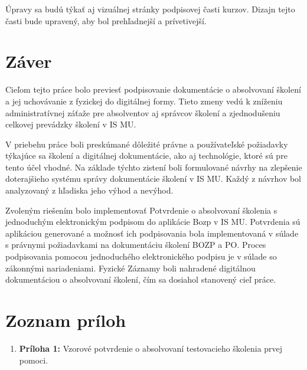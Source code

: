 \documentclass[
  digital,     %
  oneside,     %
  nosansbold,  %
  nocolorbold, %
  lof,         %
  nolot,         %
]{fithesis4}
\begin{document}
Úpravy sa budú týkať aj vizuálnej stránky podpisovej časti kurzov. Dizajn tejto časti bude upravený, aby bol prehľadnejší a prívetivejší.

\chapter*{Záver}
Cieľom tejto práce bolo previesť podpisovanie dokumentácie o absolvovaní školení a jej uchovávanie z fyzickej do digitálnej formy. Tieto zmeny vedú k zníženiu administratívnej záťaže pre absolventov aj správcov školení a zjednodušeniu celkovej prevádzky školení v IS MU.

V priebehu práce boli preskúmané dôležité právne a používateľské požiadavky týkajúce sa školení a digitálnej dokumentácie, ako aj technológie, ktoré sú pre tento účel vhodné. Na základe týchto zistení boli formulované návrhy na zlepšenie doterajšieho systému správy dokumentácie školení v IS MU. Každý z návrhov bol analyzovaný z hľadiska jeho výhod a nevýhod.

Zvoleným riešením bolo implementovať Potvrdenie o absolvovaní školenia s jednoduchým elektronickým podpisom do aplikácie Bozp v IS MU. Potvrdenia sú aplikáciou generované a možnosť ich podpisovania bola implementovaná v súlade s právnymi požiadavkami na dokumentáciu školení BOZP a PO. Proces podpisovania pomocou jednoduchého elektronického podpisu je v súlade so zákonnými nariadeniami. Fyzické Záznamy boli nahradené digitálnou dokumentáciou o absolvovaní školení, čím sa dosiahol stanovený cieľ práce.

\chapter*{Zoznam príloh}

\begin{enumerate}
    \item \textbf{Príloha 1:} Vzorové potvrdenie o absolvovaní testovacieho školenia prvej pomoci.\label{priloha1}
\end{enumerate}

\printbibliography[heading=bibintoc] %
\end{document}
